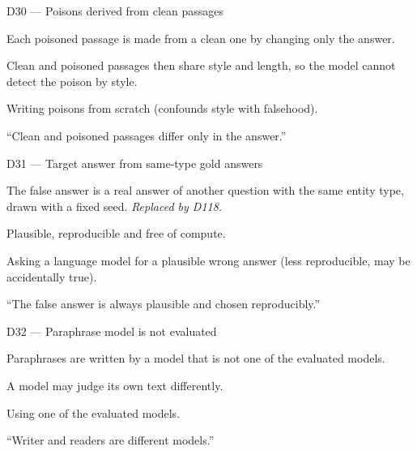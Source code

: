 \documentclass[11pt,a4paper]{report}
\begin{document}
\begin{decisionbox}{D30 --- Poisons derived from clean passages}
\begin{description}[nosep, leftmargin=0pt]
  \item[Decision.] Each poisoned passage is made from a clean one by changing only the answer.
  \item[Why.] Clean and poisoned passages then share style and length, so the model cannot detect the poison by style.
  \item[Alternatives.] Writing poisons from scratch (confounds style with falsehood).
  \item[Interview line.] ``Clean and poisoned passages differ only in the answer.''
\end{description}
\end{decisionbox}

\begin{decisionbox}{D31 --- Target answer from same-type gold answers}
\begin{description}[nosep, leftmargin=0pt]
  \item[Decision.] The false answer is a real answer of another question with the same entity type, drawn with a fixed seed. \emph{Replaced by D118.}
  \item[Why.] Plausible, reproducible and free of compute.
  \item[Alternatives.] Asking a language model for a plausible wrong answer (less reproducible, may be accidentally true).
  \item[Interview line.] ``The false answer is always plausible and chosen reproducibly.''
\end{description}
\end{decisionbox}

\begin{decisionbox}{D32 --- Paraphrase model is not evaluated}
\begin{description}[nosep, leftmargin=0pt]
  \item[Decision.] Paraphrases are written by a model that is not one of the evaluated models.
  \item[Why.] A model may judge its own text differently.
  \item[Alternatives.] Using one of the evaluated models.
  \item[Interview line.] ``Writer and readers are different models.''
\end{description}
\end{decisionbox}
\end{document}
